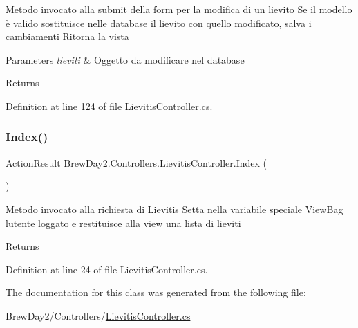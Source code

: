 Metodo invocato alla submit della form per la modifica di un lievito Se il modello è valido sostituisce nelle database il lievito con quello modificato, salva i cambiamenti Ritorna la vista 


\begin{DoxyParams}{Parameters}
{\em lieviti} & Oggetto da modificare nel database\\
\hline
\end{DoxyParams}
\begin{DoxyReturn}{Returns}

\end{DoxyReturn}


Definition at line 124 of file Lievitis\+Controller.\+cs.

\mbox{\label{class_brew_day2_1_1_controllers_1_1_lievitis_controller_aee68004d8a6975ea5628dd366158c6b4}} 
\subsubsection{\texorpdfstring{Index()}{Index()}}
{\footnotesize\ttfamily Action\+Result Brew\+Day2.\+Controllers.\+Lievitis\+Controller.\+Index (\begin{DoxyParamCaption}{ }\end{DoxyParamCaption})}



Metodo invocato alla richiesta di Lievitis Setta nella variabile speciale View\+Bag l\textquotesingle{}utente loggato e restituisce alla view una lista di lieviti 

\begin{DoxyReturn}{Returns}

\end{DoxyReturn}


Definition at line 24 of file Lievitis\+Controller.\+cs.



The documentation for this class was generated from the following file\+:\begin{DoxyCompactItemize}
\item 
Brew\+Day2/\+Controllers/\mbox{\hyperlink{_lievitis_controller_8cs}{Lievitis\+Controller.\+cs}}\end{DoxyCompactItemize}
